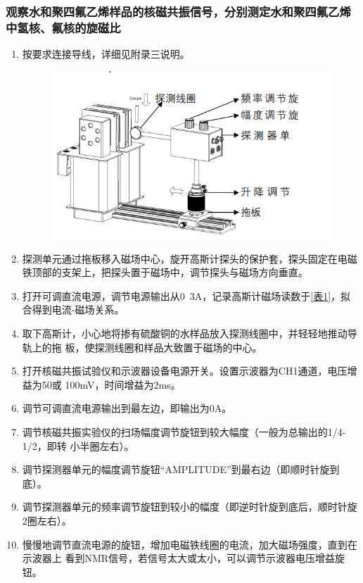 \documentclass{ctexart}
\begin{document}
	\subsubsection{观察水和聚四氟乙烯样品的核磁共振信号，分别测定水和聚四氟乙烯中氢核、氟核的旋磁比}
	\begin{enumerate}[(1)]
		\item 按要求连接导线，详细见附录三说明。
		\begin{figure}[H]
			\centering
			\includegraphics[scale=0.7]{1}
		\end{figure}
		\item 探测单元通过拖板移入磁场中心，旋开高斯计探头的保护套，探头固定在电磁铁顶部的支架上，把探头置于磁场中，调节探头与磁场方向垂直。
		\item 打开可调直流电源，调节电源输出从0~3A，记录高斯计磁场读数于\ref{表1}，拟合得到电流-磁场关系。
		\item 取下高斯计，小心地将掺有硫酸铜的水样品放入探测线圈中，并轻轻地推动导轨上的拖
		板，使探测线圈和样品大致置于磁场的中心。
		\item 打开核磁共振试验仪和示波器设备电源开关。设置示波器为CH1通道，电压增益为50或
		100mV，时间增益为2ms。
		\item 调节可调直流电源输出到最左边，即输出为0A。
		\item 调节核磁共振实验仪的扫场幅度调节旋钮到较大幅度（一般为总输出的1/4-1/2，即转
		小半圈左右）。
		\item 调节探测器单元的幅度调节旋钮“AMPLITUDE”到最右边（即顺时针旋到底）。
		\item 调节探测器单元的频率调节旋钮到较小的幅度（即逆时针旋到底后，顺时针旋2圈左右）。
		\item 慢慢地调节直流电源的旋钮，增加电磁铁线圈的电流，加大磁场强度，直到在示波器上
		看到NMR信号，若信号太大或太小，可以调节示波器电压增益旋钮。

\end{enumerate}
\end{document}
